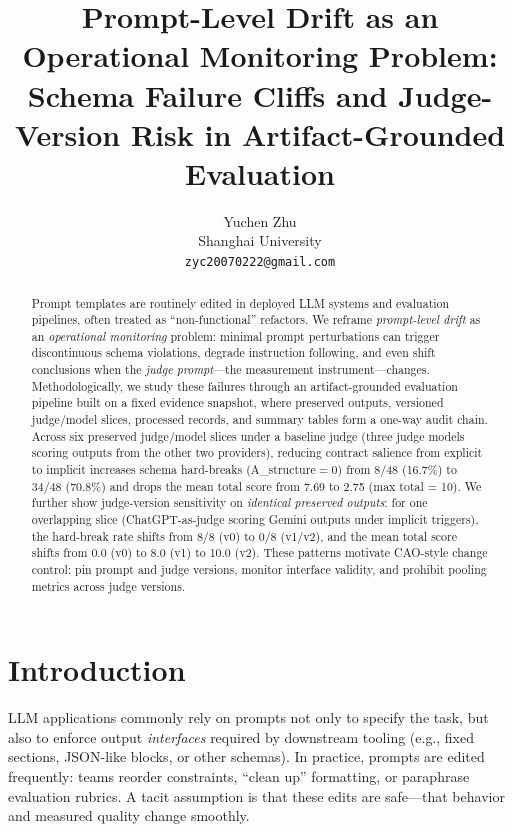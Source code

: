 \documentclass{article}
\title{Prompt-Level Drift as an Operational Monitoring Problem:\\
Schema Failure Cliffs and Judge-Version Risk in Artifact-Grounded Evaluation}
\author{Yuchen Zhu \\
Shanghai University \\
\texttt{zyc20070222@gmail.com}
}
\begin{document}
\maketitle

\makeatletter
{}
\thispagestyle{fancy}
\makeatother

\newcommand{\Astruct}{A\_structure}
\newcommand{\Bsnap}{B\_snapshot\_constraint}
\newcommand{\Cact}{C\_actionability}
\newcommand{\Dcomp}{D\_completeness}
\newcommand{\Edrift}{E\_drift\_failure}

\begin{abstract}
Prompt templates are routinely edited in deployed LLM systems and evaluation pipelines, often treated as ``non-functional'' refactors.
We reframe \emph{prompt-level drift} as an \emph{operational monitoring} problem: minimal prompt perturbations can trigger discontinuous schema violations, degrade instruction following, and even shift conclusions when the \emph{judge prompt}---the measurement instrument---changes.
Methodologically, we study these failures through an artifact-grounded evaluation pipeline built on a fixed evidence snapshot, where preserved outputs, versioned judge/model slices, processed records, and summary tables form a one-way audit chain.
Across six preserved judge/model slices under a baseline judge (three judge models scoring outputs from the other two providers), reducing contract salience from explicit to implicit increases schema hard-breaks (\Astruct$=0$) from $8/48$ (16.7\%) to $34/48$ (70.8\%) and drops the mean total score from 7.69 to 2.75 (max total = 10).
We further show judge-version sensitivity on \emph{identical preserved outputs}: for one overlapping slice (ChatGPT-as-judge scoring Gemini outputs under implicit triggers), the hard-break rate shifts from $8/8$ (v0) to $0/8$ (v1/v2), and the mean total score shifts from 0.0 (v0) to 8.0 (v1) to 10.0 (v2).
These patterns motivate CAO-style change control: pin prompt and judge versions, monitor interface validity, and prohibit pooling metrics across judge versions.
\end{abstract}

\section{Introduction}
LLM applications commonly rely on prompts not only to specify the task, but also to enforce output \emph{interfaces} required by downstream tooling (e.g., fixed sections, JSON-like blocks, or other schemas).
In practice, prompts are edited frequently: teams reorder constraints, ``clean up'' formatting, or paraphrase evaluation rubrics.
A tacit assumption is that these edits are safe---that behavior and measured quality change smoothly.
\end{document}
